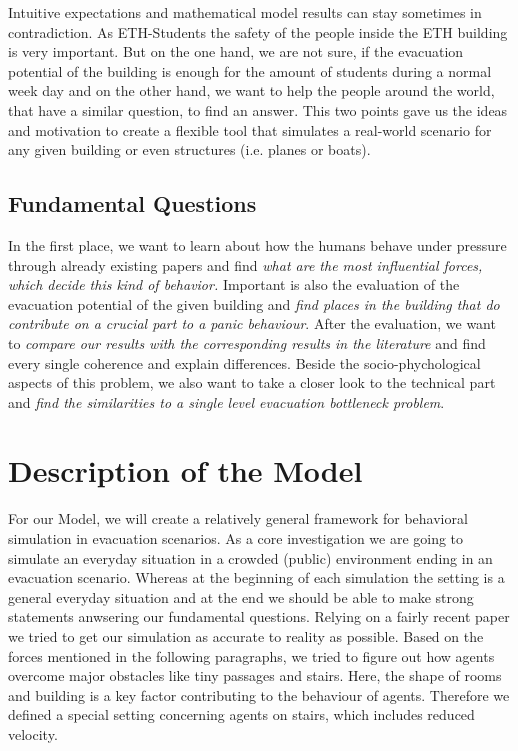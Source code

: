 \documentclass[11pt]{article}
\begin{document}
Intuitive expectations and mathematical model results can stay sometimes in
contradiction. As ETH-Students the safety of the people inside the ETH building
is very important. But on the one hand, we are not sure, if the evacuation
potential of the building is enough for the amount of students during a normal
week day and on the other hand, we want to help the people around the world,
that have a similar question, to find an answer. This two points gave us the
ideas and motivation to create a flexible tool that simulates a real-world
scenario for any given building or even structures (i.e. planes or boats).

\subsection{Fundamental Questions}

In the first place, we want to learn about how the humans behave under pressure
through already existing papers \cite{AACIBF} \cite{ACPPD}  \cite{SDFEP}
\cite{DCD} and find \textit{ what are the most influential forces, which decide
this kind of behavior.} Important is also the evaluation of the evacuation
potential of the given building and \textit{find places in the building that do
contribute on a crucial part to a panic behaviour}.  After the evaluation, we
want to \textit{compare our results with the corresponding results in the
literature} and find every single coherence and explain differences. Beside the
socio-phychological aspects of this problem, we also want to take a closer look
to the technical part and \textit{find the similarities to a single level
evacuation bottleneck problem}.


\section{Description of the Model}

For our Model, we will create a relatively general framework for behavioral
simulation in evacuation scenarios. As a core investigation we are going to
simulate an everyday situation in a crowded (public) environment ending in an
evacuation scenario. Whereas at the beginning of each simulation the setting is
a general everyday situation and at the end we should be able to make strong
statements anwsering our fundamental questions. Relying on a fairly recent paper
\cite{SDFEP} we tried to get our simulation as accurate to reality as possible.
Based on the forces mentioned in the following paragraphs, we tried to figure
out how agents overcome major obstacles like tiny passages and stairs. Here, the
shape of rooms and building is a key factor contributing to the behaviour of
agents. Therefore we defined a special setting concerning agents on stairs,
which includes reduced velocity.
\end{document}
